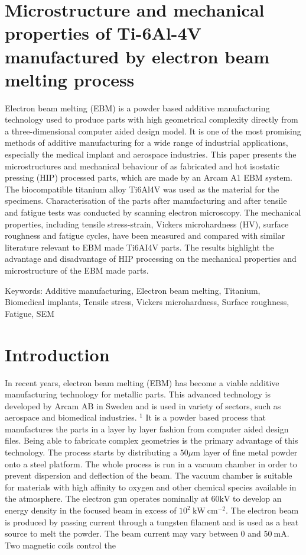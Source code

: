 \documentclass[10pt]{article}
\begin{document}
\section*{Microstructure and mechanical properties of Ti-6Al-4V manufactured by electron beam melting process }
Electron beam melting (EBM) is a powder based additive manufacturing technology used to produce parts with high geometrical complexity directly from a three-dimensional computer aided design model. It is one of the most promising methods of additive manufacturing for a wide range of industrial applications, especially the medical implant and aerospace industries. This paper presents the microstructures and mechanical behaviour of as fabricated and hot isostatic pressing (HIP) processed parts, which are made by an Arcam A1 EBM system. The biocompatible titanium alloy Ti6Al4V was used as the material for the specimens. Characterisation of the parts after manufacturing and after tensile and fatigue tests was conducted by scanning electron microscopy. The mechanical properties, including tensile stress-strain, Vickers microhardness (HV), surface roughness and fatigue cycles, have been measured and compared with similar literature relevant to EBM made Ti6AI4V parts. The results highlight the advantage and disadvantage of HIP processing on the mechanical properties and microstructure of the EBM made parts.

Keywords: Additive manufacturing, Electron beam melting, Titanium, Biomedical implants, Tensile stress, Vickers microhardness, Surface roughness, Fatigue, SEM

\section*{Introduction}
In recent years, electron beam melting (EBM) has become a viable additive manufacturing technology for metallic parts. This advanced technology is developed by Arcam AB in Sweden and is used in variety of sectors, such as aerospace and biomedical industries. ${ }^{1}$ It is a powder based process that manufactures the parts in a layer by layer fashion from computer aided design files. Being able to fabricate complex geometries is the primary advantage of this technology. The process starts by distributing a $50 \mu \mathrm{m}$ layer of fine metal powder onto a steel platform. The whole process is run in a vacuum chamber in order to prevent dispersion and deflection of the beam. The vacuum chamber is suitable for materials with high affinity to oxygen and other chemical species available in the atmosphere. The electron gun operates nominally at $60 \mathrm{kV}$ to develop an energy density in the focused beam in excess of $10^{2} \mathrm{~kW} \mathrm{~cm}{ }^{-2}$. The electron beam is produced by passing current through a tungsten filament and is used as a heat source to melt the powder. The beam current may vary between 0 and $50 \mathrm{~mA}$. Two magnetic coils control the
\end{document}
